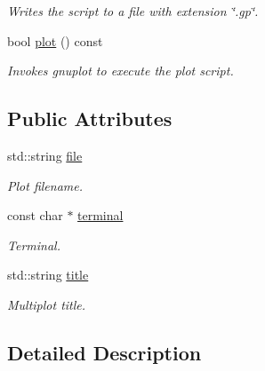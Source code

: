 \begin{DoxyCompactItemize}
\begin{DoxyCompactList}\small\item\em Writes the script to a file with extension \char`\"{}.\-gp\char`\"{}. \end{DoxyCompactList}\item 
\hypertarget{a00376_ad0bb261f48733d7db941f70e5580d3c2}{bool \hyperlink{a00376_ad0bb261f48733d7db941f70e5580d3c2}{plot} () const }\label{a00376_ad0bb261f48733d7db941f70e5580d3c2}

\begin{DoxyCompactList}\small\item\em Invokes gnuplot to execute the plot script. \end{DoxyCompactList}\end{DoxyCompactItemize}
\subsection*{Public Attributes}
\begin{DoxyCompactItemize}
\item 
\hypertarget{a00376_aa8ca7763d97797780ac1d22c43242619}{std\-::string \hyperlink{a00376_aa8ca7763d97797780ac1d22c43242619}{file}}\label{a00376_aa8ca7763d97797780ac1d22c43242619}

\begin{DoxyCompactList}\small\item\em Plot filename. \end{DoxyCompactList}\item 
\hypertarget{a00376_a20b5d0ee587a7b330a1a902bec367bd4}{const char $\ast$ \hyperlink{a00376_a20b5d0ee587a7b330a1a902bec367bd4}{terminal}}\label{a00376_a20b5d0ee587a7b330a1a902bec367bd4}

\begin{DoxyCompactList}\small\item\em Terminal. \end{DoxyCompactList}\item 
\hypertarget{a00376_ab14fca27427ba44595cc20ce994938fe}{std\-::string \hyperlink{a00376_ab14fca27427ba44595cc20ce994938fe}{title}}\label{a00376_ab14fca27427ba44595cc20ce994938fe}

\begin{DoxyCompactList}\small\item\em Multiplot title. \end{DoxyCompactList}\end{DoxyCompactItemize}


\subsection{Detailed Description}

